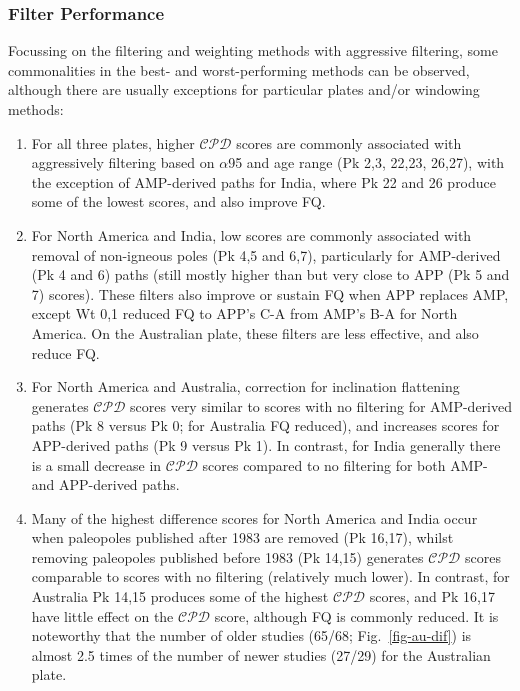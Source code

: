 \subsubsection{Filter Performance}

Focussing on the filtering and weighting methods with aggressive filtering,
some commonalities in the best- and worst-performing methods can be observed,
although there are usually exceptions for particular plates and/or windowing
methods:
%
\begin{enumerate}
  \item For all three plates, higher $\mathcal{CPD}$ scores are commonly
    associated with aggressively filtering based on $\alpha$95 and age range (Pk
    2,3, 22,23, 26,27), with the exception of AMP-derived paths for India, where
    Pk 22 and 26 produce some of the lowest scores, and also improve FQ\@.
  \item For North America and India, low scores are commonly associated with
    removal of non-igneous poles (Pk 4,5 and 6,7), particularly for AMP-derived
    (Pk 4 and 6) paths (still mostly higher than but very close to APP (Pk 5 and
    7) scores). These filters also improve or sustain FQ when APP replaces AMP,
    except Wt 0,1 reduced FQ to APP's C-A from AMP's B-A for North America. On
    the Australian plate, these filters are less effective, and also reduce
    FQ\@.
  \item For North America and Australia, correction for inclination flattening
    generates $\mathcal{CPD}$ scores very similar to scores with no filtering
    for AMP-derived paths (Pk 8 versus Pk 0; for Australia FQ reduced), and
    increases scores for APP-derived paths (Pk 9 versus Pk 1). In contrast, for
    India generally there is a small decrease in $\mathcal{CPD}$ scores compared
    to no filtering for both AMP- and APP-derived paths.
  \item Many of the highest difference scores for North America and India occur
    when paleopoles published after 1983 are removed (Pk 16,17), whilst removing
    paleopoles published before 1983 (Pk 14,15) generates $\mathcal{CPD}$ scores
    comparable to scores with no filtering (relatively much lower). In contrast,
    for Australia Pk 14,15 produces some of the highest $\mathcal{CPD}$ scores,
    and Pk 16,17 have little effect on the $\mathcal{CPD}$ score, although FQ is
    commonly reduced. It is noteworthy that the number of older studies (65/68;
    Fig.~\ref{fig-au-dif}) is almost 2.5 times of the number of newer studies
    (27/29) for the Australian plate.
\end{enumerate}

